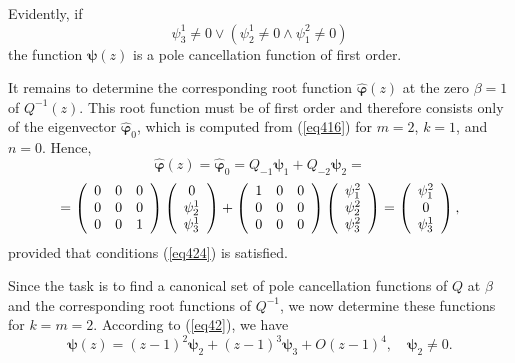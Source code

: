 \documentclass[11pt, reqno]{amsart}
\theoremstyle{plain}
\theoremstyle{remark}
\numberwithin{equation}{section}
\begin{document}
Evidently, if 
\[
\psi_{3}^{1} \neq 0 \vee \left( \psi_{2}^{1} \neq 0 \wedge \psi_{1}^{2} \neq 0\right) 
\]
the function $\boldsymbol{\psi}(z)$ is a pole cancellation function of first order.

It remains to determine the corresponding root function $\boldsymbol{\hat{\varphi}}(z)$ at the zero $\beta=1$ of $Q^{-1}(z)$. This root function must be of first order and therefore consists only of the eigenvector $\boldsymbol{\hat{\varphi}}_{0}$, which is computed from (\ref{eq416}) for $m=2$, $k=1$, and $n=0$. Hence,
\[
\boldsymbol{\hat{\varphi}}(z)=\boldsymbol{\hat{\varphi}}_{0}=Q_{-1}\boldsymbol{\psi}_{1}+Q_{-2}\boldsymbol{\psi}_{2}=
\] 
\[
=\left( {\begin{array}{*{20}c}
0 & 0 & 0\\
0 &  0 & 0\\
0 &  0 & 1\\
\end{array} } \right)\left( {\begin{array}{*{20}c}
0 \\
\psi_{2}^{1} \\
\psi_{3}^{1}\\
\end{array} } \right)+\left( {\begin{array}{*{20}c}
1 & 0 & 0\\
0 &  0 & 0\\
0 &  0 & 0\\
\end{array} } \right)\left( {\begin{array}{*{20}c}
\psi_{1}^{2} \\
\psi_{2}^{2} \\
\psi_{3}^{2}\\
\end{array} } \right)=\left( {\begin{array}{*{20}c}
\psi_{1}^{2} \\
0 \\
\psi_{3}^{1}\\
\end{array} } \right),
\]
provided that conditions (\ref{eq424}) is satisfied.

Since the task is to find a canonical set of pole cancellation functions of $Q$ at $\beta$ and the corresponding root functions of $Q^{-1}$, we now determine these functions for $k=m=2$. According to (\ref{eq42}), we have
\begin{equation}\label{eq426}
\boldsymbol{\psi}(z) =(z - 1)^{2} \boldsymbol{\psi}_{2} + (z - 1)^{3} \boldsymbol{\psi}_{3}+ O(z - 1)^{4}, \quad \boldsymbol{\psi}_{2}\neq 0.
\end{equation}
\end{document}
